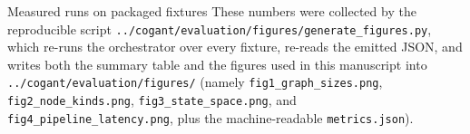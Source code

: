 \documentclass[
  ignorenonframetext,
]{beamer}
\begin{document}
\begin{frame}[fragile]{Measured runs on packaged fixtures}
These numbers were collected by the reproducible script
\texttt{../cogant/evaluation/figures/generate\_figures.py}, which
re-runs the orchestrator over every fixture, re-reads the emitted JSON,
and writes both the summary table and the figures used in this
manuscript into \texttt{../cogant/evaluation/figures/} (namely
\texttt{fig1\_graph\_sizes.png}, \texttt{fig2\_node\_kinds.png},
\texttt{fig3\_state\_space.png}, and
\texttt{fig4\_pipeline\_latency.png}, plus the machine-readable
\texttt{metrics.json}).
\end{frame}
\end{document}
